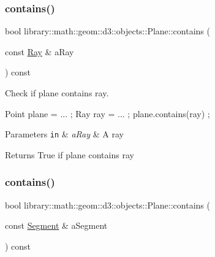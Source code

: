 \subsubsection{\texorpdfstring{contains()}{contains()}\hspace{0.1cm}{\footnotesize\ttfamily [4/5]}}
{\footnotesize\ttfamily bool library\+::math\+::geom\+::d3\+::objects\+::\+Plane\+::contains (\begin{DoxyParamCaption}\item[{const \hyperlink{classlibrary_1_1math_1_1geom_1_1d3_1_1objects_1_1_ray}{Ray} \&}]{a\+Ray }\end{DoxyParamCaption}) const}



Check if plane contains ray. 


\begin{DoxyCode}
Point plane = ... ;
Ray ray = ... ;
plane.contains(ray) ;
\end{DoxyCode}



\begin{DoxyParams}[1]{Parameters}
\mbox{\tt in}  & {\em a\+Ray} & A ray \\
\hline
\end{DoxyParams}
\begin{DoxyReturn}{Returns}
True if plane contains ray 
\end{DoxyReturn}
\mbox{\label{classlibrary_1_1math_1_1geom_1_1d3_1_1objects_1_1_plane_adb47fb2fb464a38e143f35da9122e64a}} 
\subsubsection{\texorpdfstring{contains()}{contains()}\hspace{0.1cm}{\footnotesize\ttfamily [5/5]}}
{\footnotesize\ttfamily bool library\+::math\+::geom\+::d3\+::objects\+::\+Plane\+::contains (\begin{DoxyParamCaption}\item[{const \hyperlink{classlibrary_1_1math_1_1geom_1_1d3_1_1objects_1_1_segment}{Segment} \&}]{a\+Segment }\end{DoxyParamCaption}) const}



